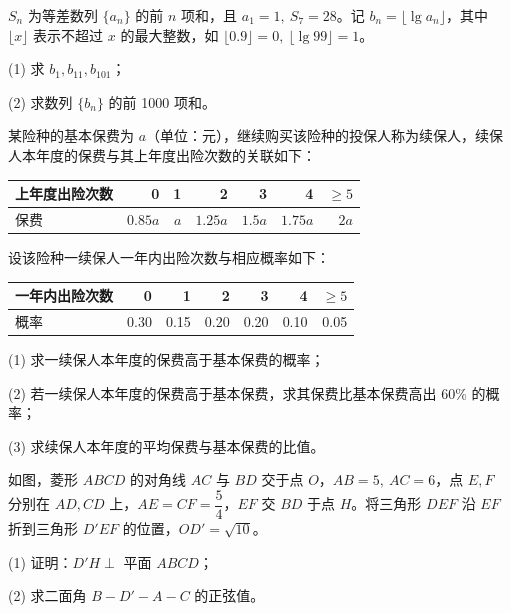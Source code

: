 \begin{question}
\(S_n\) 为等差数列 \(\{a_n\}\) 的前 \(n\) 项和，且 \(a_1=1,\ S_7=28\)。记 \(b_n=\lfloor\lg a_n\rfloor\)，其中 \(\lfloor x\rfloor\) 表示不超过 \(x\) 的最大整数，如 \(\lfloor0.9\rfloor=0,\ \lfloor\lg99\rfloor=1\)。

   (1) 求 \(b_1,b_{11},b_{101}\)；

   (2) 求数列 \(\{b_n\}\) 的前 1000 项和。

\end{question}
\begin{question}
某险种的基本保费为 \(a\)（单位：元），继续购买该险种的投保人称为续保人，续保人本年度的保费与其上年度出险次数的关联如下：

\begin{center}
\begin{tabular}{lrrrrrr}
\toprule
上年度出险次数 & 0 & 1 & 2 & 3 & 4 & \(\geq5\) \\
\midrule
保费 & \(0.85a\) & \(a\) & \(1.25a\) & \(1.5a\) & \(1.75a\) & \(2a\) \\
\bottomrule
\end{tabular}
\end{center}

设该险种一续保人一年内出险次数与相应概率如下：

\begin{center}
\begin{tabular}{lrrrrrr}
\toprule
一年内出险次数 & 0 & 1 & 2 & 3 & 4 & \(\geq5\) \\
\midrule
概率 & 0.30 & 0.15 & 0.20 & 0.20 & 0.10 & 0.05 \\
\bottomrule
\end{tabular}
\end{center}

   (1) 求一续保人本年度的保费高于基本保费的概率；

   (2) 若一续保人本年度的保费高于基本保费，求其保费比基本保费高出 60\% 的概率；

   (3) 求续保人本年度的平均保费与基本保费的比值。

\Needspace{0.4\textheight}
\end{question}
\begin{question}
如图，菱形 \(ABCD\) 的对角线 \(AC\) 与 \(BD\) 交于点 \(O\)，\(AB=5,\ AC=6\)，点 \(E,F\) 分别在 \(AD,CD\) 上，\(AE=CF=\dfrac54\)，\(EF\) 交 \(BD\) 于点 \(H\)。将三角形 \(DEF\) 沿 \(EF\) 折到三角形 \(D'EF\) 的位置，\(OD'=\sqrt{10}\)。
\nopagebreak[4]
\begin{center}\end{center}
\nopagebreak[4]
   (1) 证明：\(D'H\perp\) 平面 \(ABCD\)；

   (2) 求二面角 \(B-D'-A-C\) 的正弦值。

\end{question}
